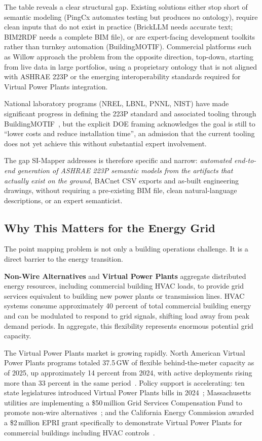 The table reveals a clear structural gap.
Existing solutions either stop short of semantic modeling (PingCx automates testing but produces no
ontology), require clean inputs that do not exist in practice (BrickLLM needs accurate text;
BIM2RDF needs a complete BIM file), or are expert-facing development toolkits rather than turnkey
automation (BuildingMOTIF).
Commercial platforms such as Willow approach the problem from the opposite direction, top-down,
starting from live data in large portfolios, using a proprietary ontology that is not aligned with
ASHRAE 223P or the emerging interoperability standards required for Virtual Power Plants integration.

National laboratory programs (NREL, LBNL, PNNL, NIST) have made significant progress in defining
the 223P standard and associated tooling through BuildingMOTIF~\cite{BuildingMOTIF_NREL,DOE_BuildingMOTIF},
but the explicit DOE framing acknowledges the goal is still to ``lower costs and reduce installation
time'', an admission that the current tooling does not yet achieve this without substantial expert
involvement.

The gap SI-Mapper addresses is therefore specific and narrow:
\emph{automated end-to-end generation of ASHRAE 223P semantic models from the artifacts that
actually exist on the ground}, BACnet CSV exports and as-built engineering drawings, without
requiring a pre-existing BIM file, clean natural-language descriptions, or an expert semanticist.

\subsection{Why This Matters for the Energy Grid}
\label{subsec:grid-relevance}

The point mapping problem is not only a building operations challenge.
It is a direct barrier to the energy transition.

\textbf{Non-Wire Alternatives} and \textbf{Virtual Power Plants} aggregate distributed
energy resources, including commercial building HVAC loads, to provide grid services equivalent to
building new power plants or transmission lines.
HVAC systems consume approximately 40 percent of total commercial building energy and can be
modulated to respond to grid signals, shifting load away from peak demand periods.
In aggregate, this flexibility represents enormous potential grid capacity.

The Virtual Power Plants market is growing rapidly.
North American Virtual Power Plants programs totaled 37.5\,GW of flexible behind-the-meter capacity
as of 2025, up approximately 14 percent from 2024, with active deployments rising more than 33
percent in the same period~\cite{WoodMac2025}.
Policy support is accelerating: ten state legislatures introduced Virtual Power Plants bills in
2024~\cite{RMI_VP3_2025,SEPA_NCCETC2025}; Massachusetts utilities are implementing a
\$50\,million Grid Services Compensation Fund to promote non-wire alternatives~\cite{RMI_VP3_2025};
and the California Energy Commission awarded a \$2\,million EPRI grant specifically to demonstrate
Virtual Power Plants for commercial buildings including HVAC controls~\cite{CEC_EPRI2024}.

